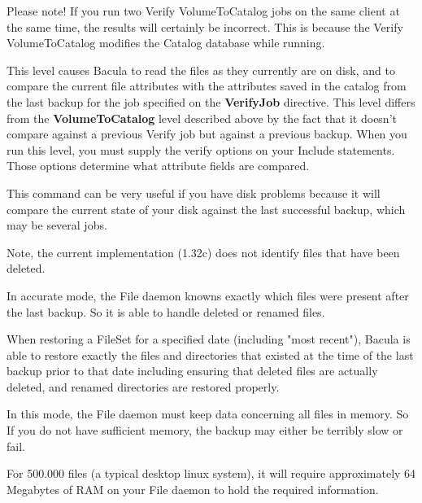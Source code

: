 \begin{description}
\begin{description}
   Please note!  If you run two Verify VolumeToCatalog jobs on the same
   client at the same time, the results will certainly be incorrect.  This
   is because the Verify VolumeToCatalog modifies the Catalog database
   while running.

\item [DiskToCatalog]
   This level causes Bacula to read the files as they currently are on
   disk, and to compare the current file attributes with the attributes
   saved in the catalog from the last backup for the job specified on the
   {\bf VerifyJob} directive.  This level differs from the {\bf VolumeToCatalog}
   level described above by the fact that it doesn't compare against a
   previous Verify job but against a previous backup.  When you run this
   level, you must supply the verify options on your Include statements.
   Those options determine what attribute fields are compared.

   This command can be very useful if you have disk problems because it
   will compare the current state of your disk against the last successful
   backup, which may be several jobs.

   Note, the current implementation (1.32c) does not identify files that
   have been deleted.
\end{description}

\item [Accurate = \lt{}yes\vb{}no\gt{}]
   In accurate mode, the File daemon knowns exactly which files were present
   after the last backup. So it is able to handle deleted or renamed files.

   When restoring a FileSet for a specified date (including "most
   recent"), Bacula is able to restore exactly the files and
   directories that existed at the time of the last backup prior to
   that date including ensuring that deleted files are actually deleted,
   and renamed directories are restored properly.

   In this mode, the File daemon must keep data concerning all files in
   memory.  So If you do not have sufficient memory, the backup may
   either be terribly slow or fail.


   For 500.000 files (a typical desktop linux system), it will require
   approximately 64 Megabytes of RAM on your File daemon to hold the
   required information.


\end{description}
